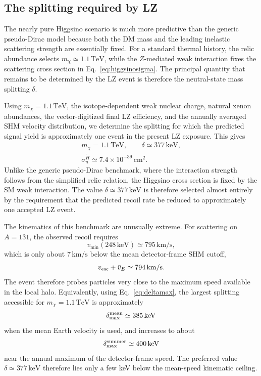 \documentclass[aps,prd,reprint,superscriptaddress,nofootinbib,longbibliography,floatfix]{revtex4-2}
\newcommand{\TeV}{\mathrm{TeV}}
\newcommand{\keV}{\mathrm{keV}}
\begin{document}
\subsection{The splitting required by LZ}

The nearly pure Higgsino scenario is much more predictive than the generic pseudo-Dirac model because both the DM mass and the leading inelastic scattering strength are essentially fixed. For a standard thermal history, the relic abundance selects $m_\chi\simeq1.1\,\TeV$, while the $Z$-mediated weak interaction fixes the scattering cross section in Eq.~\eqref{eq:higgsinosigma}. The principal quantity that remains to be determined by the LZ event is therefore the neutral-state mass splitting $\delta$.

Using $m_\chi=1.1\,\TeV$, the isotope-dependent weak nuclear charge, natural xenon abundances, the vector-digitized final LZ efficiency, and the annually averaged SHM velocity distribution, we determine the splitting for which the predicted signal yield is approximately one event in the present LZ exposure. This gives
\begin{equation}
\begin{gathered}
m_\chi=1.1\,\TeV,\qquad \delta\simeq377\,\keV,\\
\sigma_n^{\widetilde H}\simeq7.4\times10^{-39}\,\mathrm{cm}^2.
\end{gathered}
\label{eq:higgsinobenchmark}
\end{equation}
Unlike the generic pseudo-Dirac benchmark, where the interaction strength follows from the simplified relic relation, the Higgsino cross section is fixed by the SM weak interaction. The value $\delta\simeq377\,\keV$ is therefore selected almost entirely by the requirement that the predicted recoil rate be reduced to approximately one accepted LZ event.

The kinematics of this benchmark are unusually extreme. For scattering on $A=131$, the observed recoil requires
\begin{equation}
v_{\min}(248\,\keV)\simeq795\,\mathrm{km/s},
\end{equation}
which is only about $7\,\mathrm{km/s}$ below the mean detector-frame SHM cutoff,
\begin{equation}
v_{\rm esc}+\bar v_E\simeq794\,\mathrm{km/s}.
\end{equation}
The event therefore probes particles very close to the maximum speed available in the local halo. Equivalently, using Eq.~\eqref{eq:deltamax}, the largest splitting accessible for $m_\chi=1.1\,\TeV$ is approximately
\begin{equation}
\delta_{\max}^{\rm mean}\simeq385\,\keV
\end{equation}
when the mean Earth velocity is used, and increases to about
\begin{equation}
\delta_{\max}^{\rm summer}\simeq400\,\keV
\end{equation}
near the annual maximum of the detector-frame speed. The preferred value $\delta\simeq377\,\keV$ therefore lies only a few keV below the mean-speed kinematic ceiling.
\end{document}
